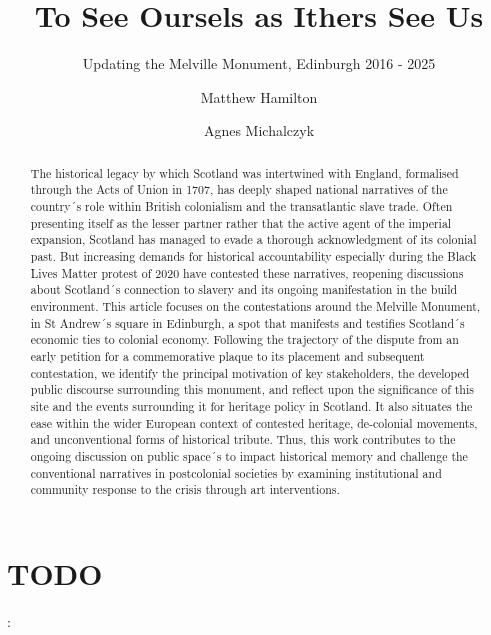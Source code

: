 \documentclass{scrartcl}
\title{To See Oursels as Ithers See Us}
\subtitle{Updating the Melville Monument, Edinburgh 2016 - 2025}
\author[1]{Matthew Hamilton}
\author[2]{Agnes Michalczyk}
\affil[1]{Università di Bologna / University of Edinburgh}
\affil[2]{Freie Universität Berlin / University of Edinburgh}
\date{}
\begin{document}
\maketitle

\begin{abstract}
The historical legacy by which Scotland was intertwined with England, formalised through the Acts of Union in 1707, has deeply shaped national narratives of the country´s role within British colonialism and the transatlantic slave trade. Often presenting itself as the lesser partner rather that the active agent of the imperial expansion, Scotland has managed to evade a thorough acknowledgment of its colonial past. But increasing demands for historical accountability especially during the Black Lives Matter protest of 2020 have contested these narratives, reopening discussions about Scotland´s connection to slavery and its ongoing manifestation in the build environment. This article focuses on the contestations around the Melville Monument, in St Andrew´s square in Edinburgh, a spot that manifests and testifies Scotland´s economic ties to colonial economy. Following the trajectory of the dispute from an early petition for a commemorative plaque to its placement and subsequent contestation, we identify the principal motivation of key stakeholders, the developed public discourse surrounding this monument, and reflect upon the significance of this site and the events surrounding it for heritage policy in Scotland. It also situates the ease within the wider European context of contested heritage, de-colonial movements, and unconventional forms of historical tribute. Thus, this work contributes to the ongoing discussion on public space´s to impact historical memory and challenge the conventional narratives in postcolonial societies by examining institutional and community response to the crisis through art interventions. 
\end{abstract}

\section{TODO}:
\end{document}
